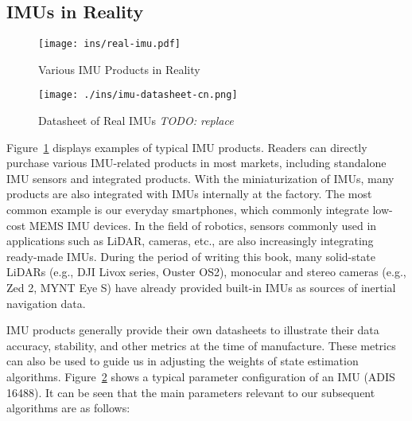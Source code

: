 \subsection{IMUs in Reality}
\begin{figure}
	\centering
	\texttt{[image: ins/real-imu.pdf]}
	\caption{Various IMU Products in Reality}
	\label{fig:real-imus}
\end{figure}


\begin{figure}
	\centering
	\texttt{[image: ./ins/imu-datasheet-cn.png]}
	\caption{Datasheet of Real IMUs \emph{TODO: replace}}
	\label{fig:imu-datasheet}
\end{figure}

Figure~\ref{fig:real-imus} displays examples of typical IMU products. Readers can directly purchase various IMU-related products in most markets, including standalone IMU sensors and integrated products. With the miniaturization of IMUs, many products are also integrated with IMUs internally at the factory. The most common example is our everyday smartphones, which commonly integrate low-cost MEMS IMU devices. In the field of robotics, sensors commonly used in applications such as LiDAR, cameras, etc., are also increasingly integrating ready-made IMUs. During the period of writing this book, many solid-state LiDARs (e.g., DJI Livox series, Ouster OS2), monocular and stereo cameras (e.g., Zed 2, MYNT Eye S) have already provided built-in IMUs as sources of inertial navigation data.

IMU products generally provide their own datasheets to illustrate their data accuracy, stability, and other metrics at the time of manufacture. These metrics can also be used to guide us in adjusting the weights of state estimation algorithms. Figure~\ref{fig:imu-datasheet} shows a typical parameter configuration of an IMU (ADIS 16488). It can be seen that the main parameters relevant to our subsequent algorithms are as follows:


